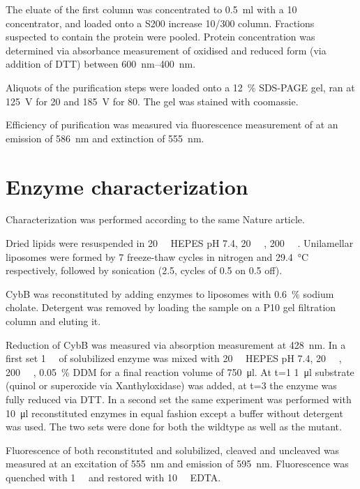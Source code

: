 The eluate of the first column was concentrated to \SI{0.5}{\ml} with a
\SI{10}{\kilo\Da} concentrator, and loaded onto a S200 increase 10/300 column.
Fractions suspected to contain the protein were pooled. Protein concentration
was determined via absorbance measurement of oxidised and reduced form (via
addition of DTT) between \SIrange{600}{400}{\nm}.

Aliquots of the purification steps were loaded onto a \SI{12}{\percent}
SDS-PAGE gel, ran at \SI{125}{\V} for \SI{20}{\min} and \SI{185}{\V} for
\SI{80}{\min}. The gel was stained with coomassie.

Efficiency of purification was measured via fluorescence measurement of
\hsdsred{} at an emission of \SI{586}{\nm} and extinction of \SI{555}{\nm}.

\section{Enzyme characterization}

Characterization was performed according to the same Nature
article\cite{superoxide_salvaging}.

Dried lipids were resuspended in \SI{20}{\milli\Molar} HEPES pH 7.4,
\SI{20}{\milli\Molar} , \SI{200}{\milli\Molar} . Unilamellar
liposomes were formed by 7 freeze-thaw cycles in nitrogen and \SI{29.4}{\celsius}
respectively, followed by sonication (\SI{2.5}{\min}, cycles of \SI{0.5}{\min}
on \SI{0.5}{\min} off).

CybB was reconstituted by adding enzymes to liposomes with \SI{0.6}{\percent}
sodium cholate. Detergent was removed by loading the sample on a P10 gel
filtration column and eluting it.

Reduction of CybB was measured via absorption measurement at \SI{428}{\nm}. In
a first set \SI{1}{\micro\Molar} of solubilized enzyme was mixed with
\SI{20}{\milli\Molar} HEPES pH 7.4, \SI{20}{\milli\Molar} ,
\SI{200}{\milli\Molar} , \SI{0.05}{\percent} DDM for a final reaction
volume of \SI{750}{\ul}. At t=\SI{1}{\min} \SI{1}{\ul} substrate (quinol or
superoxide via Xanthyloxidase) was added, at t=\SI{3}{\min} the enzyme was
fully reduced via DTT. In a second set the same experiment was performed with
\SI{10}{\ul} reconstituted enzymes in equal fashion except a buffer without
detergent was used. The two sets were done for both the wildtype as well as the
mutant.

Fluorescence of both reconstituted and solubilized, cleaved and uncleaved
\hsdsred{} was measured at an excitation of \SI{555}{\nm} and emission of
\SI{595}{\nm}.  Fluorescence was quenched with \SI{1}{\milli\Molar} 
and restored with \SI{10}{\milli\Molar} EDTA.

